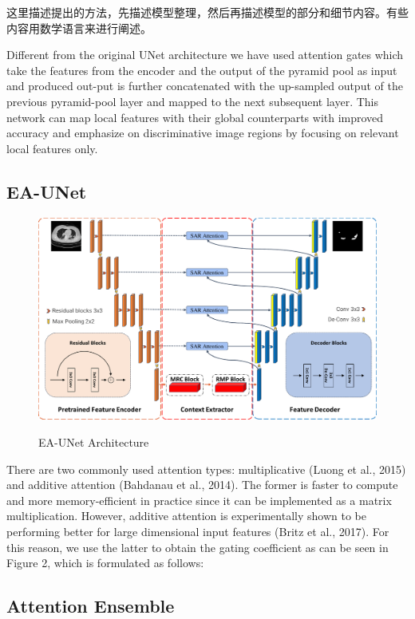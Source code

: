 \documentclass[UTF8]{article} %
\begin{document}
这里描述提出的方法，先描述模型整理，然后再描述模型的部分和细节内容。有些内容用数学语言来进行阐述。

Different from the original UNet architecture we have used attention gates which take the features from the encoder and the output of the pyramid pool as input and produced out-put is further concatenated with the up-sampled output of the previous pyramid-pool layer and mapped to the next subsequent layer. This network can map local features with their global counterparts with improved accuracy and emphasize on discriminative image regions by focusing on relevant local features only.


\subsection{EA-UNet}
\begin{figure}[H]
\small
\centering
\includegraphics[width=1\textwidth]{overview}
\label{fig:overview}
\caption{EA-UNet Architecture}
\end{figure}

There are two commonly used attention types: multiplicative (Luong et al., 2015) and additive attention (Bahdanau et al., 2014). The former is faster to compute and more memory-efficient in practice since it can be implemented as a
matrix multiplication. However, additive attention is experimentally shown to be performing better for large dimensional input features (Britz et al., 2017). For this reason, we use the latter to obtain the gating coefficient as can be seen in Figure 2, which is formulated as follows:

\subsection{Attention Ensemble}
\end{document}
